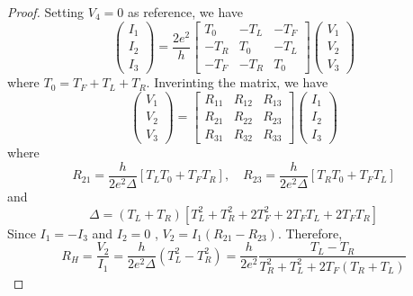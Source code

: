 \documentclass[11pt,a4paper]{article}
\theoremstyle{plain}
\theoremstyle{definition}
\theoremstyle{remark}
\begin{document}
\begin{proof}
    Setting $V_4 = 0$ as reference, we have
    \begin{equation*}
        \begin{pmatrix}
            I_1 \\ I_2 \\ I_3
        \end{pmatrix}
        = \frac{2e^2}{h}
        \begin{bmatrix}
            T_0 & -T_L & -T_F\\
            -T_R & T_0 & -T_L\\
            -T_F & -T_R & T_0
        \end{bmatrix}
        \begin{pmatrix}
            V_1 \\ V_2 \\ V_3
        \end{pmatrix}
    \end{equation*}
    where $T_0 = T_F + T_L + T_R$. Inverinting the matrix, we have
    \begin{equation*}
        \begin{pmatrix}
            V_1 \\ V_2 \\ V_3
        \end{pmatrix}
        =
        \begin{bmatrix}
            R_{11} & R_{12} & R_{13}\\
            R_{21} & R_{22} & R_{23}\\
            R_{31} & R_{32} & R_{33}
        \end{bmatrix}
        \begin{pmatrix}
            I_1 \\ I_2 \\ I_3
        \end{pmatrix}
    \end{equation*}
    where
    \begin{equation*}
        R_{21} = \frac{h}{2e^2\Delta} [T_LT_0 + T_FT_R], \quad R_{23} = \frac{h}{2e^2\Delta} [T_RT_0 + T_FT_L]
    \end{equation*}
    and \begin{equation*}
            \Delta = (T_L+T_R)\left[T_L^2 + T_R^2 +2T_F^2 +2T_F T_L + 2T_F T_R\right]
        \end{equation*}
        Since $I_1 = -I_3$ and $I_2 = 0$ , $V_2 = I_1 (R_{21} - R_{23})$. Therefore,
    \begin{equation*}
        R_H = \frac{V_2}{I_1} = \frac{h}{2e^2 \Delta} (T_L^2 - T_R^2) = \frac{h}{2e^2}\frac{T_L - T_R}{T_R^2 + T_L^2 + 2T_F(T_R + T_L)}
    \end{equation*}
\end{proof}
\end{document}
